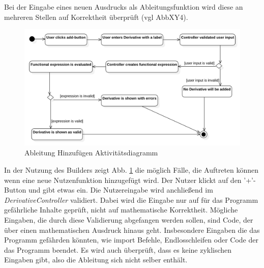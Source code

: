 \documentclass{article}
\begin{document}
Bei der Eingabe eines neuen Ausdrucks als Ableitungsfunktion wird diese an mehreren Stellen auf Korrektheit überprüft (vgl AbbXY4). 
\begin{figure}[H]%
    \centering
    \includegraphics[width=13cm]{entwurf/Floriane/AktivityAddDerivative.png}
    \caption{Ableitung Hinzufügen Aktivitätsdiagramm}
    \label{Ableitung Hinzufügen Aktivitätsdiagramm}
\end{figure}
In der Nutzung des Builders zeigt Abb. \ref{Ableitung Hinzufügen Aktivitätsdiagramm} die möglich Fälle, die Auftreten können wenn eine neue Nutzenfunktion hinzugefügt wird. Der Nutzer klickt auf den '+'-Button und gibt etwas ein. Die Nutzereingabe wird anchließend im \textit{DerivativeController} validiert. Dabei wird die Eingabe nur auf für das Programm gefährliche Inhalte geprüft, nicht auf mathematische Korrektheit. Mögliche Eingaben, die durch diese Validierung abgefangen werden sollen, sind Code, der über einen mathematischen Ausdruck hinaus geht. Insbesondere Eingaben die das Programm gefährden könnten, wie import Befehle, Endlosschleifen oder Code der das Programm beendet. Es wird auch überprüft, dass es keine zyklischen Eingaben gibt, also die Ableitung sich nicht selber enthält.
\end{document}
